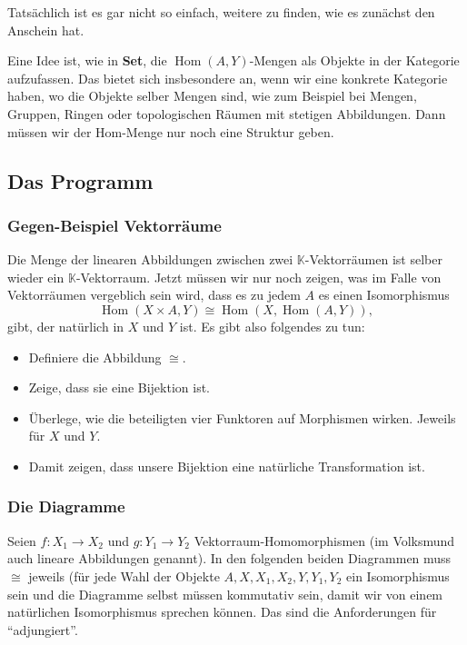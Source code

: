 \documentclass[a4paper]{amsart}
\theoremstyle{definition}
\DeclareMathOperator{\Hom}{Hom}
\newcommand{\K}{\ensuremath{\mathbb{ K }}}
\begin{document}
Tatsächlich ist es gar nicht so einfach, weitere zu finden, wie es zunächst den Anschein hat. 

Eine Idee ist, wie in \textbf{Set}, die $\Hom( A, Y)$-Mengen als Objekte in der Kategorie aufzufassen. Das bietet sich insbesondere an, wenn wir eine konkrete Kategorie haben, wo die Objekte selber Mengen sind, wie zum Beispiel bei Mengen, Gruppen, Ringen oder topologischen Räumen mit stetigen Abbildungen. Dann müssen wir der Hom-Menge nur noch eine Struktur geben.

\subsection{Das Programm}

\subsubsection{Gegen-Beispiel Vektorräume}
Die Menge der linearen Abbildungen zwischen zwei $\K$-Vektorräumen ist selber wieder ein  $\K$-Vektorraum. Jetzt müssen wir nur noch zeigen, was im Falle von Vektorräumen vergeblich sein wird, dass es zu jedem $A$ es einen
Isomorphismus
\begin{equation}
	\Hom(X \times A, Y ) \cong \Hom(X, \Hom( A, Y)),
\end{equation}
gibt, der natürlich in $X$ und $Y$ ist. Es gibt also folgendes zu tun:
\begin{itemize}
   \item Definiere die Abbildung $\cong$.
   \item Zeige, dass sie eine Bijektion ist.
   \item Überlege, wie die beteiligten vier Funktoren auf Morphismen wirken. Jeweils für $X$ und $Y$. 
   \item Damit zeigen, dass unsere Bijektion eine natürliche Transformation ist.
\end{itemize}

\subsubsection{Die Diagramme}
Seien $f \colon X_1 \to X_2$ und $g \colon Y_1 \to Y_2$ Vektorraum-Homomorphismen (im Volksmund auch lineare Abbildungen genannt). In den folgenden beiden Diagrammen muss $\cong$ jeweils (für jede Wahl der Objekte $A, X, X_1, X_2, Y, Y_1, Y_2$ ein Isomorphismus sein und die Diagramme selbst müssen kommutativ sein, damit wir von einem natürlichen Isomorphismus sprechen können. Das sind die Anforderungen für "`adjungiert"'.
\end{document}
